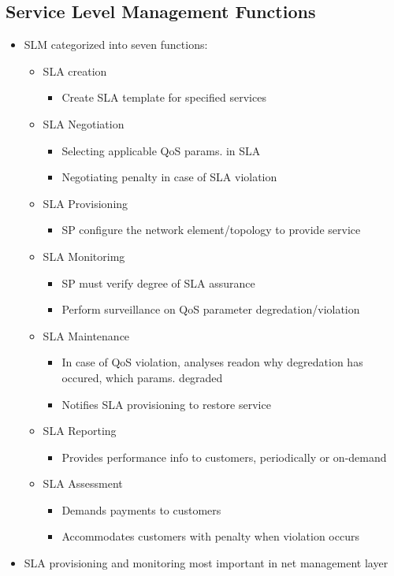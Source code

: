\documentclass[a4paper]{article}
\begin{document}
\subsection{Service Level Management Functions}
\begin{itemize}
	\item SLM categorized into seven functions:
	\begin{itemize}
		\item SLA creation
		\begin{itemize}
			\item Create SLA template for specified services
		\end{itemize}
		\item SLA Negotiation
		\begin{itemize}
			\item Selecting applicable QoS params. in SLA
			\item Negotiating penalty in case of SLA violation
		\end{itemize}
		\item SLA Provisioning
		\begin{itemize}
			\item SP configure the network element/topology to
				provide service
		\end{itemize}
		\item SLA Monitorimg
		\begin{itemize}
			\item SP must verify degree of SLA assurance
			\item Perform surveillance on QoS parameter
				degredation/violation
		\end{itemize}
		\item SLA Maintenance
		\begin{itemize}
			\item  In case of QoS violation, analyses readon why
				degredation has occured, which params. degraded
			\item Notifies SLA provisioning to restore service
		\end{itemize}
		\item SLA Reporting
		\begin{itemize}
			\item Provides performance info to customers,
				periodically or on-demand
		\end{itemize}
		\item SLA Assessment
		\begin{itemize}
			\item Demands payments to customers
			\item Accommodates customers with penalty when violation
				occurs
		\end{itemize}
	\end{itemize}
	\item SLA provisioning and monitoring most important in net management
		layer
\end{itemize}
\end{document}
